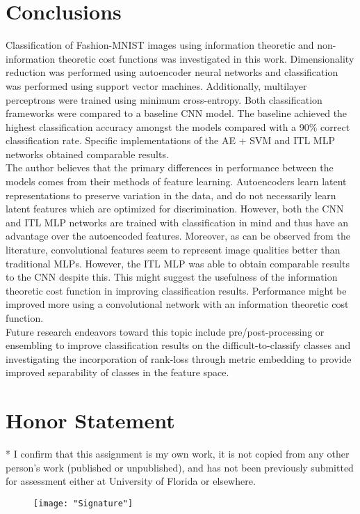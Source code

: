 \documentclass[conference]{IEEEtran}
\begin{document}
\section{Conclusions} \label{Conclusions}
Classification of Fashion-MNIST images using information theoretic and non-information theoretic cost functions was investigated in this work.  Dimensionality reduction was performed using autoencoder neural networks and classification was performed using support vector machines. Additionally, multilayer perceptrons were trained using minimum cross-entropy.  Both classification frameworks were compared to a baseline CNN model.  The baseline achieved the highest classification accuracy amongst the models compared with a 90\% correct classification rate.  Specific implementations of the AE + SVM and ITL MLP networks obtained comparable results.\\
\indent The author believes that the primary differences in performance between the models comes from their methods of feature learning.  Autoencoders learn latent representations to preserve variation in the data, and do not necessarily learn latent features which are optimized for  discrimination.  However, both the CNN and ITL MLP networks are trained with classification in mind and thus have an advantage over the autoencoded features.  Moreover, as can be observed from the literature, convolutional features seem to represent image qualities better than traditional MLPs. However, the ITL MLP was able to obtain comparable results to the CNN despite this.  This might suggest the usefulness of the information theoretic cost function in improving classification results.  Performance might be improved more using a convolutional network with an  information theoretic cost function.  \\
\indent
Future research endeavors toward this topic include pre/post-processing or ensembling to improve classification results on the difficult-to-classify classes and investigating the incorporation of rank-loss through metric embedding to provide improved separability of classes in the feature space.


\section*{Honor Statement}
\noindent
* I confirm that this assignment is my own work, it is not copied from any other person's work (published or unpublished), and has not been previously submitted for assessment either at University of Florida or elsewhere.

 \begin{figure}[h!]
 	\centering
 	\texttt{[image: "Signature"]}
 \end{figure}



\end{document}
